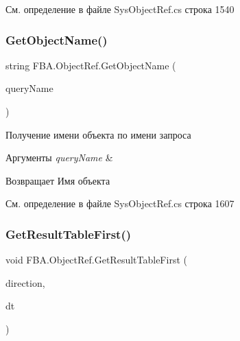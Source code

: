 См. определение в файле Sys\+Object\+Ref.\+cs строка 1540

\mbox{\label{class_f_b_a_1_1_object_ref_ad87b5a2c9d5b8984ae100a8b994f0e80}} 
\subsubsection{\texorpdfstring{Get\+Object\+Name()}{GetObjectName()}}
{\footnotesize\ttfamily string F\+B\+A.\+Object\+Ref.\+Get\+Object\+Name (\begin{DoxyParamCaption}\item[{string}]{query\+Name }\end{DoxyParamCaption})}



Получение имени объекта по имени запроса 


\begin{DoxyParams}{Аргументы}
{\em query\+Name} & \\
\hline
\end{DoxyParams}
\begin{DoxyReturn}{Возвращает}
Имя объекта
\end{DoxyReturn}


См. определение в файле Sys\+Object\+Ref.\+cs строка 1607

\mbox{\label{class_f_b_a_1_1_object_ref_aff59f834ef3b759c10048d40866d9369}} 
\subsubsection{\texorpdfstring{Get\+Result\+Table\+First()}{GetResultTableFirst()}}
{\footnotesize\ttfamily void F\+B\+A.\+Object\+Ref.\+Get\+Result\+Table\+First (\begin{DoxyParamCaption}\item[{\mbox{\hyperlink{namespace_f_b_a_a6ff7d5c242d98046d1980715b06d7300}{Direction\+Query}}}]{direction,  }\item[{out \mbox{\hyperlink{_sys_static_8cs_a6542cfcff2f8e81f06ade15aa0bfe2b7}{System.\+Data.\+Data\+Table}}}]{dt }\end{DoxyParamCaption})}



